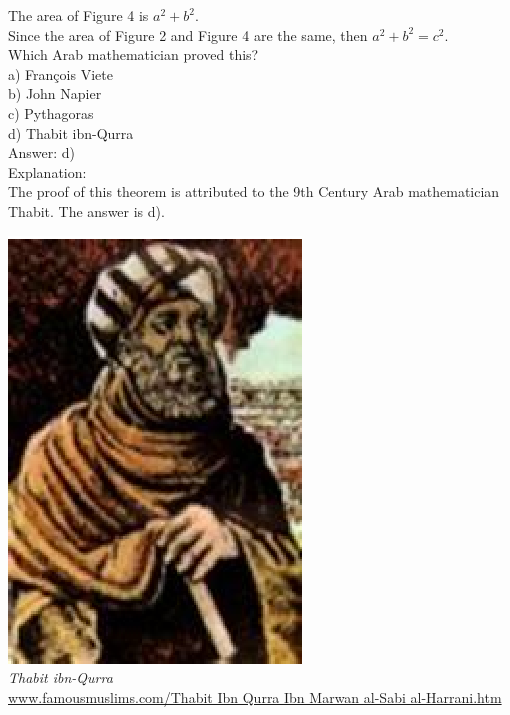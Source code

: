 \documentclass[letterpaper, 12pt]{article}
\begin{document}
The area of Figure 4 is $a^{2} + b^{2}$.\\

Since the area of Figure 2 and Figure 4 are the same, then $a^{2} + b^{2} = c^{2}$.\\

Which Arab mathematician proved this?\\

a) Fran\c cois Viete\\
b) John Napier\\
c) Pythagoras\\
d) Thabit ibn-Qurra\\

Answer: d)\\

Explanation:\\
The proof of this theorem is attributed to the 9th Century Arab mathematician Thabit. The answer is d).\\
\begin{center}
\includegraphics[scale=0.7]{thabit.eps}\\
\emph{{\small Thabit ibn-Qurra}}\\
\href{http://www.famousmuslims.com/Thabit Ibn Qurra Ibn Marwan al-Sabi al-Harrani.htm}{www.famousmuslims.com/Thabit Ibn Qurra Ibn Marwan al-Sabi al-Harrani.htm}\\[5mm]
\end{center}
\end{document}
